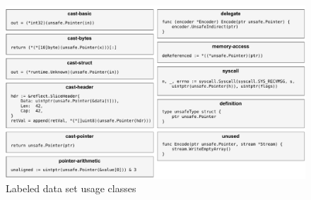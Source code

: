 \begin{figure}[ht!]
    \includegraphics[width=\textwidth]{assets/figures/chapter4/usage-labels.pdf}
    \caption{Labeled data set usage classes}
    \label{fig:usage-labels}
\end{figure}
